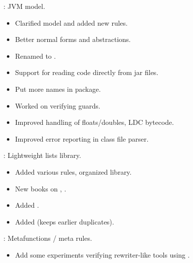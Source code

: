 
\begin{frame}

\implibtitle

:
JVM model.
\begin{itemize}
\item Clarified model and added new rules.
\item Better normal forms and abstractions.
\item Renamed  to .
\item Support for reading code directly from jar files.
\item Put more names in  package.
\item Worked on verifying guards.
\item Improved handling of floats/doubles, LDC bytecode.
\item Improved error reporting in class file parser.
\end{itemize}

\end{frame}


\begin{frame}

\implibtitle

:
Lightweight lists library.
\begin{itemize}
\item Added various rules, organized library.
\item New books on , .
\item Added .
\item Added  (keeps earlier duplicates).
\end{itemize}

\end{frame}


\begin{frame}

\implibtitle

:
Metafunctions / meta rules.
\begin{itemize}
\item Add some experiments verifying rewriter-like tools using .
\end{itemize}

\end{frame}

